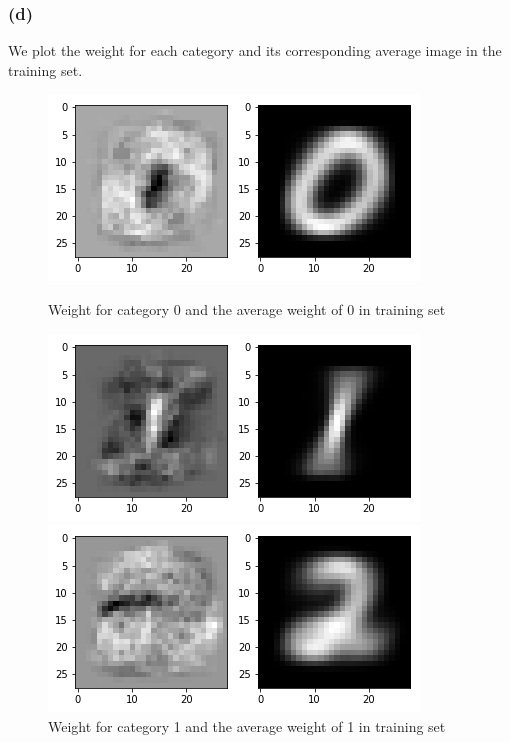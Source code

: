 \documentclass{article}
\begin{document}
\subsubsection{(d)}

We plot the weight for each category and its corresponding average image in the training set.

\begin{figure}[thbp]
	\begin{minipage}{0.48\textwidth}
		\centering
		\includegraphics[width=\textwidth]{pics/0.png}
		\caption{Weight for category 0 and the average weight of 0 in training set}
	\end{minipage}\hfill
	\begin {minipage}{0.48\textwidth}
	\centering
	\includegraphics[width=\textwidth]{pics/1.png}
	\caption{Weight for category 1 and the average weight of 1 in training set}
\end{minipage}
	\begin{minipage}{0.48\textwidth}
		\centering
		\includegraphics[width=\textwidth]{pics/2.png}

\end{minipage}
\end{figure}
\end{document}
